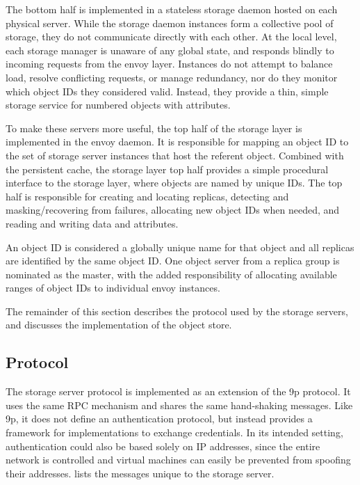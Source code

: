 The bottom half is implemented in a stateless storage daemon hosted on each physical server. While the storage daemon instances form a collective pool of storage, they do not communicate directly with each other. At the local level, each storage manager is unaware of any global state, and responds blindly to incoming requests from the envoy layer. Instances do not attempt to balance load, resolve conflicting requests, or manage redundancy, nor do they monitor which object IDs they considered valid. Instead, they provide a thin, simple storage service for numbered objects with attributes.

To make these servers more useful, the top half of the storage layer is implemented in the envoy daemon. It is responsible for mapping an object ID to the set of storage server instances that host the referent object. Combined with the persistent cache, the storage layer top half provides a simple procedural interface to the storage layer, where objects are named by unique IDs. The top half is responsible for creating and locating replicas, detecting and masking/recovering from failures, allocating new object IDs when needed, and reading and writing data and attributes.

An object ID is considered a globally unique name for that object and all replicas are identified by the same object ID. One object server from a replica group is nominated as the master, with the added responsibility of allocating available ranges of object IDs to individual envoy instances.

The remainder of this section describes the protocol used by the storage servers, and discusses the implementation of the object store.

\subsection{Protocol}

The storage server protocol is implemented as an extension of the 9p protocol. It uses the same RPC mechanism and shares the same hand-shaking messages. Like 9p, it does not define an authentication protocol, but instead provides a framework for implementations to exchange credentials. In its intended setting, authentication could also be based solely on IP addresses, since the entire network is controlled and virtual machines can easily be prevented from spoofing their addresses.  lists the messages unique to the storage server.

